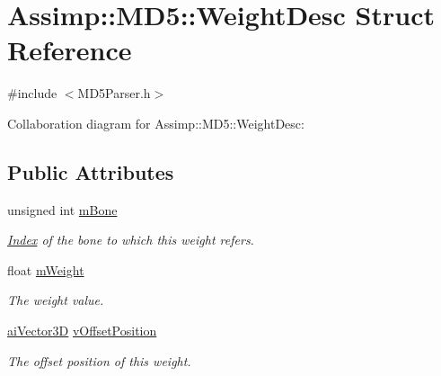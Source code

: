 \hypertarget{struct_assimp_1_1_m_d5_1_1_weight_desc}{\section{Assimp\+:\+:M\+D5\+:\+:Weight\+Desc Struct Reference}
\label{struct_assimp_1_1_m_d5_1_1_weight_desc}
}


{\ttfamily \#include $<$M\+D5\+Parser.\+h$>$}



Collaboration diagram for Assimp\+:\+:M\+D5\+:\+:Weight\+Desc\+:
\subsection*{Public Attributes}
\begin{DoxyCompactItemize}
\item 
\hypertarget{struct_assimp_1_1_m_d5_1_1_weight_desc_ac4e9aa50ec158235cf9156b6fd69529e}{unsigned int \hyperlink{struct_assimp_1_1_m_d5_1_1_weight_desc_ac4e9aa50ec158235cf9156b6fd69529e}{m\+Bone}}\label{struct_assimp_1_1_m_d5_1_1_weight_desc_ac4e9aa50ec158235cf9156b6fd69529e}

\begin{DoxyCompactList}\small\item\em \hyperlink{struct_index}{Index} of the bone to which this weight refers. \end{DoxyCompactList}\item 
\hypertarget{struct_assimp_1_1_m_d5_1_1_weight_desc_aa8698c40ccda234729acb63e784d58fe}{float \hyperlink{struct_assimp_1_1_m_d5_1_1_weight_desc_aa8698c40ccda234729acb63e784d58fe}{m\+Weight}}\label{struct_assimp_1_1_m_d5_1_1_weight_desc_aa8698c40ccda234729acb63e784d58fe}

\begin{DoxyCompactList}\small\item\em The weight value. \end{DoxyCompactList}\item 
\hypertarget{struct_assimp_1_1_m_d5_1_1_weight_desc_a500e92668bc2bd29806b32ca8180143f}{\hyperlink{structai_vector3_d}{ai\+Vector3\+D} \hyperlink{struct_assimp_1_1_m_d5_1_1_weight_desc_a500e92668bc2bd29806b32ca8180143f}{v\+Offset\+Position}}\label{struct_assimp_1_1_m_d5_1_1_weight_desc_a500e92668bc2bd29806b32ca8180143f}

\begin{DoxyCompactList}\small\item\em The offset position of this weight. \end{DoxyCompactList}\end{DoxyCompactItemize}


